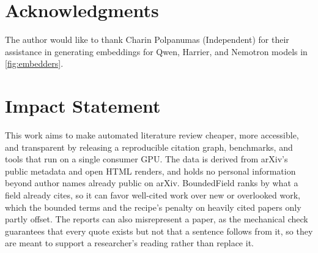 \section*{Acknowledgments}
The author would like to thank Charin Polpanumas (Independent) for their assistance in generating embeddings for Qwen, Harrier, and Nemotron models in \cref{fig:embedders}.

\section*{Impact Statement}
This work aims to make automated literature review cheaper, more accessible, and transparent by releasing a reproducible citation graph, benchmarks, and tools that run on a single consumer GPU. The data is derived from arXiv's public metadata and open HTML renders, and holds no personal information beyond author names already public on arXiv. BoundedField ranks by what a field already cites, so it can favor well-cited work over new or overlooked work, which the bounded terms and the  recipe's penalty on heavily cited papers only partly offset. The reports can also misrepresent a paper, as the mechanical check guarantees that every quote exists but not that a sentence follows from it, so they are meant to support a researcher's reading rather than replace it.
